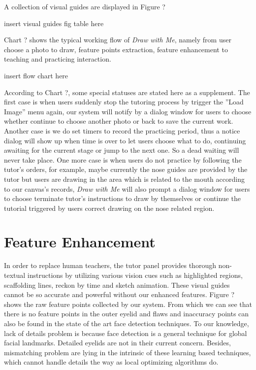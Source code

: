 		A collection of visual guides are displayed in Figure ?\\
		\begin{center}
			insert visual guides fig table here
			\end{center}
		
		Chart ? shows the typical working flow of \textit{Draw with Me}, namely from user choose a photo to draw, feature points extraction, feature enhancement to teaching and practicing interaction. \\
			\begin{center}
			insert flow chart here
			\end{center}

		According to Chart ?, some special statuses are stated here as a supplement. The first case is when users suddenly stop the tutoring process by trigger the ''Load Image'' menu again, our system will notify by a dialog window for users to choose whether continue to choose another photo or back to save the current work. Another case is we do set timers to record the practicing period, thus a notice dialog will show up when time is over to let users choose what to do, continuing awaiting for the current stage or jump to the next one. So a dead waiting will never take place. One more case is when users do not practice by following the tutor's orders, for example, maybe currently the nose guides are provided by the tutor but users are drawing in the area which is related to the mouth according to our canvas's records, \textit{Draw with Me} will also prompt a dialog window for users to choose terminate tutor's instructions to draw by themselves or continue the tutorial triggered by users correct drawing on the nose related region.

\section{Feature Enhancement} \label{sec-vg}
		In order to replace human teachers, the tutor panel provides thorough non-textual instructions by utilizing various vision cues such as highlighted regions, scaffolding lines, reckon by time and sketch animation. These visual guides cannot be so accurate and powerful without our enhanced features. Figure ? shows the raw feature points collected by our system. From which we can see that there is no feature points in the outer eyelid and flaws and inaccuracy points can also be found in the state of the art face detection techniques. To our knowledge, lack of details problem is because face detection is a general technique for global facial landmarks. Detailed eyelids are not in their current concern. Besides, mismatching problem are lying in the intrinsic of these learning based techniques, which cannot handle details the way as local optimizing algorithms do. \\
		
